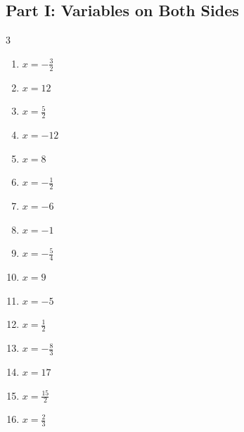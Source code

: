 \documentclass[11pt]{article}
\begin{document}
\subsection*{Part I: Variables on Both Sides}
\begin{multicols}{3}
\begin{enumerate}
  \item $x = - \frac{3}{2}$
  \item $x = 12$
  \item $x = \frac{5}{2}$
  \item $x = -12$
  \item $x = 8$
  \item $x = - \frac{1}{2}$
  \item $x = -6$
  \item $x = -1$
  \item $x = - \frac{5}{4}$
  \item $x = 9$
  \item $x = -5$
  \item $x = \frac{1}{2}$
  \item $x = - \frac{8}{3}$
  \item $x = 17$
  \item $x = \frac{15}{2}$
  \item $x = \frac{2}{3}$
\end{enumerate}
\end{multicols}
\end{document}
